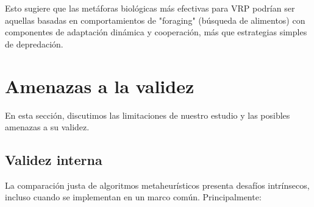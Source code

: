 \documentclass[conference,a4paper]{IEEEtran}
\begin{document}
Esto sugiere que las metáforas biológicas más efectivas para VRP podrían ser aquellas basadas en comportamientos de "foraging" (búsqueda de alimentos) con componentes de adaptación dinámica y cooperación, más que estrategias simples de depredación.

\section{Amenazas a la validez}

En esta sección, discutimos las limitaciones de nuestro estudio y las posibles amenazas a su validez.

\subsection{Validez interna}

La comparación justa de algoritmos metaheurísticos presenta desafíos intrínsecos, incluso cuando se implementan en un marco común. Principalmente:
\end{document}

